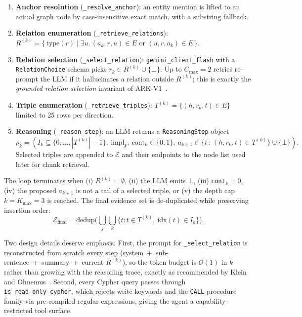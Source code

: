 \documentclass[11pt,a4paper]{article}
\begin{document}
\begin{enumerate}
  \item \textbf{Anchor resolution} (\texttt{\_resolve\_anchor}): an entity
  mention is lifted to an actual graph node by case-insensitive exact match,
  with a substring fallback.
  \item \textbf{Relation enumeration} (\texttt{\_retrieve\_relations}):
  $R^{(k)}=\{\,\text{type}(r)\mid \exists u.\,(a_k,r,u)\in E\text{ or }(u,r,a_k)\in E\,\}$.
  \item \textbf{Relation selection} (\texttt{\_select\_relation}):
  \texttt{gemini\_client\_flash} with a \texttt{RelationChoice} schema picks
  $r_k\in R^{(k)}\cup\{\bot\}$. Up to $C_{\max}=2$ retries re-prompt the LLM
  if it hallucinates a relation outside $R^{(k)}$; this is exactly the
  \emph{grounded relation selection} invariant of ARK-V1~\cite{arkv12025}.
  \item \textbf{Triple enumeration} (\texttt{\_retrieve\_triples}):
  $T^{(k)}=\{(h,r_k,t)\in E\}$ limited to 25 rows per direction.
  \item \textbf{Reasoning} (\texttt{\_reason\_step}): an LLM returns a
  \texttt{ReasoningStep} object
  \[
  \rho_k=(I_k\subseteq\{0,\dots,|T^{(k)}|-1\},\ \text{impl}_k,\
  \text{cont}_k\in\{0,1\},\ a_{k+1}\in\{t\,:\,(h,r_k,t)\in T^{(k)}\}\cup\{\bot\}).
  \]
  Selected triples are appended to $\mathcal{E}$ and their endpoints to the
  node list used later for chunk retrieval.
\end{enumerate}

The loop terminates when (i) $R^{(k)}=\emptyset$, (ii) the LLM emits $\bot$,
(iii) \texttt{cont}$_k=0$, (iv) the proposed $a_{k+1}$ is not a tail of a
selected triple, or (v) the depth cap $k=K_{\max}=3$ is reached. The final
evidence set is de-duplicated while preserving insertion order:
\[
\mathcal{E}_{\text{final}}=\text{dedup}\Big(\bigcup_{j}\bigcup_{k}\{t:t\in T^{(k)},\ \text{idx}(t)\in I_k\}\Big).
\]

Two design details deserve emphasis. First, the prompt for
\texttt{\_select\_relation} is reconstructed from scratch every step
(system~+~sub-sentence~+~summary~+~current $R^{(k)}$), so the token budget is
$\mathcal{O}(1)$ in $k$ rather than growing with the reasoning trace, exactly
as recommended by Klein and Ohnemus~\cite{arkv12025}. Second, every Cypher
query passes through \texttt{is\_read\_only\_cypher}, which rejects write
keywords and the \texttt{CALL} procedure family via pre-compiled regular
expressions, giving the agent a capability-restricted tool surface.
\end{document}
